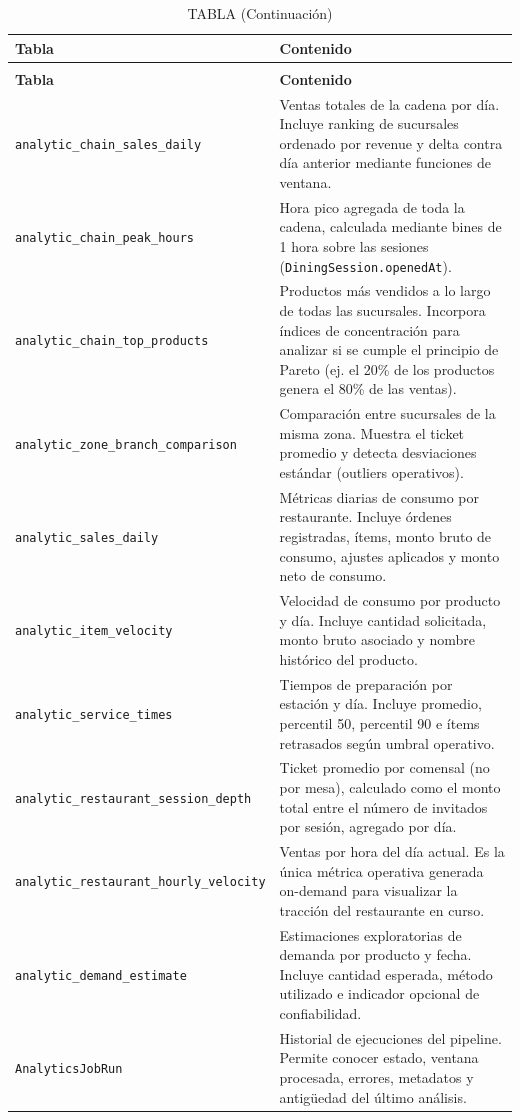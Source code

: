 \begin{longtable}{p{6cm}p{10cm}}
\caption{Tablas analíticas Gold} \label{tab:gold_tables} \\
\hline
\textbf{Tabla} & \textbf{Contenido} \\
\hline
\endfirsthead
\caption[]{TABLA \thetable{} (Continuación)} \\
\hline
\textbf{Tabla} & \textbf{Contenido} \\
\hline
\endhead
\hline
\endfoot
\texttt{analytic\_chain\_sales\_daily} &
Ventas totales de la cadena por día. Incluye ranking de sucursales ordenado por revenue y delta contra día anterior mediante funciones de ventana. \\
\hline
\texttt{analytic\_chain\_peak\_hours} &
Hora pico agregada de toda la cadena, calculada mediante bines de 1 hora sobre las sesiones (\texttt{DiningSession.openedAt}). \\
\hline
\texttt{analytic\_chain\_top\_products} &
Productos más vendidos a lo largo de todas las sucursales. Incorpora índices de concentración para analizar si se cumple el principio de Pareto (ej. el 20\% de los productos genera el 80\% de las ventas). \\
\hline
\texttt{analytic\_zone\_branch\_comparison} &
Comparación entre sucursales de la misma zona. Muestra el ticket promedio y detecta desviaciones estándar (outliers operativos). \\
\hline
\texttt{analytic\_sales\_daily} &
Métricas diarias de consumo por restaurante. Incluye órdenes registradas, ítems,
monto bruto de consumo, ajustes aplicados y monto neto de consumo. \\
\hline
\texttt{analytic\_item\_velocity} &
Velocidad de consumo por producto y día. Incluye cantidad solicitada, monto bruto
asociado y nombre histórico del producto. \\
\hline
\texttt{analytic\_service\_times} &
Tiempos de preparación por estación y día. Incluye promedio, percentil 50, percentil 90
e ítems retrasados según umbral operativo. \\
\hline
\texttt{analytic\_restaurant\_session\_depth} &
Ticket promedio por comensal (no por mesa), calculado como el monto total entre el número de invitados por sesión, agregado por día. \\
\hline
\texttt{analytic\_restaurant\_hourly\_velocity} &
Ventas por hora del día actual. Es la única métrica operativa generada on-demand para visualizar la tracción del restaurante en curso. \\
\hline
\texttt{analytic\_demand\_estimate} &
Estimaciones exploratorias de demanda por producto y fecha. Incluye cantidad esperada,
método utilizado e indicador opcional de confiabilidad. \\
\hline
\texttt{AnalyticsJobRun} &
Historial de ejecuciones del pipeline. Permite conocer estado, ventana procesada,
errores, metadatos y antigüedad del último análisis. \\
\hline
\end{longtable}

